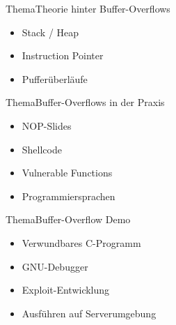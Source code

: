 \begin{frame}{Thema}{Theorie hinter Buffer-Overflows}
    \begin{itemize}
        \item Stack / Heap
        \item Instruction Pointer
        \item Pufferüberläufe
    \end{itemize}
\end{frame}

\begin{frame}{Thema}{Buffer-Overflows in der Praxis}
    \begin{itemize}
        \item NOP-Slides
        \item Shellcode
        \item Vulnerable Functions
        \item Programmiersprachen
    \end{itemize}
\end{frame}


\begin{frame}{Thema}{Buffer-Overflow Demo}
    \begin{itemize}
        \item Verwundbares C-Programm
        \item GNU-Debugger
        \item Exploit-Entwicklung
        \item Ausführen auf Serverumgebung
    \end{itemize}
\end{frame}
